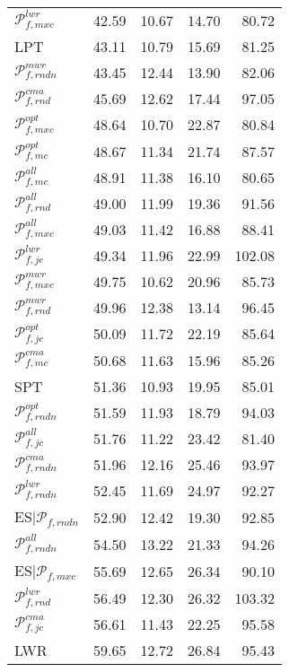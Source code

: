 \begin{tabular}{|@{}l@{}|@{}r@{}|@{}r@{}|@{}r@{}|@{}r@{}|}
${\mathcal{P}_{f,mxc}^{lwr}}$ &  42.59 &  10.67 &  14.70 &  80.72  \\ 
LPT &  43.11 &  10.79 &  15.69 &  81.25  \\ 
${\mathcal{P}_{f,rndn}^{mwr}}$ &  43.45 &  12.44 &  13.90 &  82.06  \\ \hline\hline
${\mathcal{P}_{f,rnd}^{cma}}$ &  45.69 &  12.62 &  17.44 &  97.05  \\ \hline\hline
${\mathcal{P}_{f,mxc}^{opt}}$ &  48.64 &  10.70 &  22.87 &  80.84  \\ 
${\mathcal{P}_{f,mc}^{opt}}$ &  48.67 &  11.34 &  21.74 &  87.57  \\ 
${\mathcal{P}_{f,mc}^{all}}$ &  48.91 &  11.38 &  16.10 &  80.65  \\ 
${\mathcal{P}_{f,rnd}^{all}}$ &  49.00 &  11.99 &  19.36 &  91.56  \\ 
${\mathcal{P}_{f,mxc}^{all}}$ &  49.03 &  11.42 &  16.88 &  88.41  \\ 
${\mathcal{P}_{f,jc}^{lwr}}$ &  49.34 &  11.96 &  22.99 &  102.08  \\ 
${\mathcal{P}_{f,mxc}^{mwr}}$ &  49.75 &  10.62 &  20.96 &  85.73  \\ 
${\mathcal{P}_{f,rnd}^{mwr}}$ &  49.96 &  12.38 &  13.14 &  96.45  \\ 
${\mathcal{P}_{f,jc}^{opt}}$ &  50.09 &  11.72 &  22.19 &  85.64  \\ 
${\mathcal{P}_{f,mc}^{cma}}$ &  50.68 &  11.63 &  15.96 &  85.26  \\ 
SPT &  51.36 &  10.93 &  19.95 &  85.01  \\ 
${\mathcal{P}_{f,rndn}^{opt}}$ &  51.59 &  11.93 &  18.79 &  94.03  \\ 
${\mathcal{P}_{f,jc}^{all}}$ &  51.76 &  11.22 &  23.42 &  81.40  \\ 
${\mathcal{P}_{f,rndn}^{cma}}$ &  51.96 &  12.16 &  25.46 &  93.97  \\ 
${\mathcal{P}_{f,rndn}^{lwr}}$ &  52.45 &  11.69 &  24.97 &  92.27  \\ 
ES$|{\mathcal{P}_{f,rndn}}$ &  52.90 &  12.42 &  19.30 &  92.85  \\ 
${\mathcal{P}_{f,rndn}^{all}}$ &  54.50 &  13.22 &  21.33 &  94.26  \\ 
ES$|{\mathcal{P}_{f,mxc}}$ &  55.69 &  12.65 &  26.34 &  90.10  \\ 
${\mathcal{P}_{f,rnd}^{lwr}}$ &  56.49 &  12.30 &  26.32 &  103.32  \\ 
${\mathcal{P}_{f,jc}^{cma}}$ &  56.61 &  11.43 &  22.25 &  95.58  \\ \hline\hline
LWR &  59.65 &  12.72 &  26.84 &  95.43  \\ \hline
\end{tabular}
